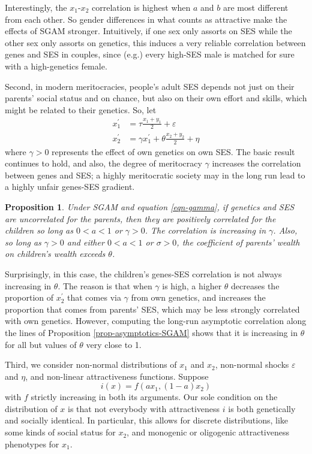 \documentclass[
  12pt,
]{article}
\newtheorem{proposition}{Proposition}
\theoremstyle{definition}
\theoremstyle{definition}
\theoremstyle{definition}
\theoremstyle{definition}
\theoremstyle{remark}
\begin{document}
Interestingly, the \(x_1\)-\(x_2\) correlation is highest when \(a\) and \(b\) are most
different from each other. So gender differences in what counts as attractive
make the effects of SGAM stronger. Intuitively, if one sex only assorts on
SES while the other sex only assorts on genetics, this induces a very reliable
correlation between genes and SES in couples, since (e.g.) every high-SES male
is matched for sure with a high-genetics female.

Second, in modern meritocracies, people's adult SES depends not just
on their parents' social status and on chance, but also on their own effort and
skills, which might be related to their genetics. So, let
\begin{align}
x^\prime_1 &= \tau \frac{x_{1} + y_{1}}{2} + \varepsilon   \nonumber \\
x^\prime_2 &= \gamma x^\prime_1 + \theta \frac{x_{2}+y_{2}}{2}+\eta \label{eqn-gamma}
\end{align}
where \(\gamma > 0\) represents the effect of own genetics on own SES.
The basic result continues to hold, and also, the degree of meritocracy \(\gamma\)
increases the correlation between genes and SES; a highly meritocratic
society may in the long run lead to a highly unfair genes-SES gradient.

\begin{proposition}\label{prop-gamma}
Under SGAM and equation \eqref{eqn-gamma}, if genetics and SES are 
uncorrelated for the parents, then they
are positively correlated for the children so long as $0 < a < 1$ or
$\gamma > 0$. The correlation is increasing in $\gamma$. Also, so 
long as $\gamma > 0$ and either $0 < a < 1$ or $\sigma > 0$, the coefficient 
of parents' wealth on children's wealth exceeds $\theta$.
\end{proposition}

Surprisingly, in this case, the children's genes-SES correlation is not always
increasing in \(\theta\). The reason is that when \(\gamma\) is high, a higher
\(\theta\) decreases the proportion of \(x^\prime_2\) that comes via \(\gamma\) from
own genetics, and increases the proportion that comes from parents' SES, which
may be less strongly correlated with own genetics. However,
computing the long-run asymptotic correlation along the lines of Proposition
\ref{prop-asymptotics-SGAM} shows that it is increasing in \(\theta\) for
all but values of \(\theta\) very close to 1.

Third, we consider non-normal distributions of \(x_1\) and \(x_2\), non-normal
shocks \(\varepsilon\) and \(\eta\), and non-linear attractiveness functions. Suppose
\begin{equation}\label{non-linear-f} 
i(x) = f(ax_1, (1-a)x_2) 
\end{equation}
with \(f\) strictly increasing in both its arguments. Our sole condition on the
distribution of \(x\) is that not everybody with attractiveness \(i\) is both
genetically and socially identical. In particular, this allows for discrete
distributions, like some kinds of social status for \(x_2\), and monogenic or
oligogenic attractiveness phenotypes for \(x_1\).
\end{document}
